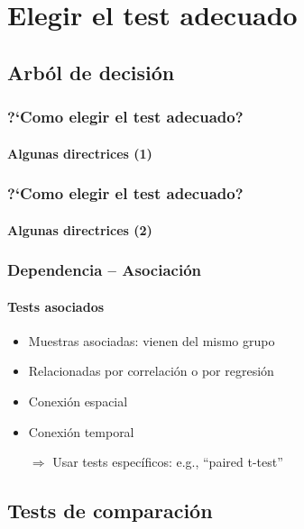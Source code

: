\documentclass[mathserif]{beamer}
\begin{document}
\section[?`Cu\'al test?]{Elegir el test adecuado}

\subsection[Arb\'ol de decisi\'on]{Arb\'ol de decisi\'on}

\begin{frame}[label=chtest1]
   \frametitle{?`Como elegir el test adecuado?}
   \framesubtitle{Algunas directrices (1)}
   \scriptsize
   
\end{frame}%


\begin{frame}[label=chtest2]
   \frametitle{?`Como elegir el test adecuado?}
   \framesubtitle{Algunas directrices (2)}
   \scriptsize
   
   \normalsize
\end{frame}%


\begin{frame}[label=deppair]
   \frametitle{Dependencia -- Asociaci\'on}
   \framesubtitle{Tests asociados}
   \begin{itemize}
      \item Muestras asociadas: vienen del mismo grupo
      \item Relacionadas por correlaci\'on o por regresi\'on
      \item Conexi\'on espacial
      \item Conexi\'on temporal
      \vspace{1ex}
      \item[$\Rightarrow$] Usar tests espec\'ificos: e.g., ``paired t-test''
   \end{itemize}
\end{frame}%


\subsection[Comparaci\'on]{Tests de comparaci\'on}
\end{document}

